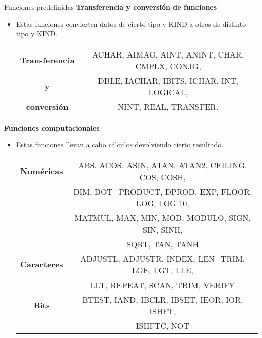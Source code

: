 \begin{frame}[fragile]{Funciones predefinidas}
 \textbf{Transferencia y conversión de funciones}
 \begin{itemize}[<+(1)->]
  \item Estas funciones convierten datos de cierto tipo y KIND a otros de distinto tipo y KIND.
   \vspace{0.1cm}
   \begin{table}[]
    \centering
    \label{Tabla_funciones_transfyconvers}
    \resizebox{9cm}{!} {
      \begin{tabular}{|c|c|}
        \hline
        \textbf{Transferencia}  & ACHAR, AIMAG, AINT, ANINT, CHAR, CMPLX, CONJG,\\        
        \textbf{y}              & DBLE, IACHAR, IBITS, ICHAR, INT, LOGICAL,     \\                   
        \textbf{conversión}     & NINT, REAL, TRANSFER.                         \\ \hline
      \end{tabular}}
    \end{table}
  \end{itemize}
 \textbf{Funciones computacionales}
 \begin{itemize}[<+(2)->]
  \item Estas funciones llevan a cabo cálculos devolviendo cierto resultado.
    \vspace{0.1cm}
    \begin{table}[]
    \centering
    \label{Tabla_funciones_computacionales}
    \resizebox{9cm}{!} {
      \begin{tabular}{|c|c|}
        \hline
        \textbf{Numéricas}     & ABS, ACOS, ASIN, ATAN, ATAN2, CEILING, COS, COSH,   \\
                               & DIM, DOT\_PRODUCT, DPROD, EXP, FLOOR, LOG, LOG 10,  \\
                               & MATMUL, MAX, MIN, MOD, MODULO, SIGN, SIN, SINH,     \\
                               & SQRT, TAN, TANH                                     \\ \hline       
        \textbf{Caracteres}    & ADJUSTL, ADJUSTR, INDEX, LEN\_TRIM, LGE, LGT, LLE,  \\
                               & LLT, REPEAT, SCAN, TRIM, VERIFY                     \\ \hline                      
        \textbf{Bits}          & BTEST, IAND, IBCLR, IBSET, IEOR, IOR, ISHFT,        \\
                               & ISHFTC, NOT                                         \\ \hline    
      \end{tabular}}
    \end{table}
  \end{itemize}
\end{frame}

